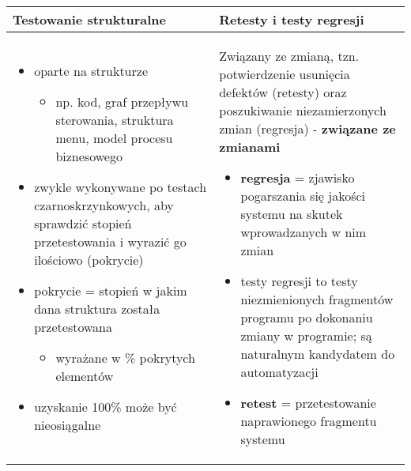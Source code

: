 \documentclass[../main.tex]{subfiles}
\begin{document}
    \begin{table}[H]
        \begin{center}
            \begin{tabular}{| p{8cm}| p{8cm}|}
                \hline
                \textbf{Testowanie strukturalne} & \textbf{Retesty i testy regresji}\\
                \hline
                \begin{itemize}
                    \item oparte na strukturze
                    \begin{itemize}
                        \item np. kod, graf przepływu sterowania, struktura menu, model procesu biznesowego
                    \end{itemize}
                    \item zwykle wykonywane po testach czarnoskrzynkowych, aby sprawdzić stopień przetestowania i wyrazić go
                    ilościowo (pokrycie)
                    \item pokrycie = stopień w jakim dana struktura została przetestowana
                    \begin{itemize}
                        \item wyrażane w \% pokrytych elementów
                    \end{itemize}
                    \item uzyskanie 100\% może być nieosiągalne
                \end{itemize}
                &
                Związany ze zmianą, tzn. potwierdzenie usunięcia defektów
                (retesty) oraz poszukiwanie niezamierzonych zmian (regresja) - \textbf{związane ze zmianami}
                \begin{itemize}
                    \item \textbf{regresja} = zjawisko pogarszania się jakości systemu na skutek
                    wprowadzanych w nim zmian
                    \item testy regresji to testy niezmienionych fragmentów programu
                    po dokonaniu zmiany w programie; są naturalnym kandydatem do automatyzacji
                    \item \textbf{retest} = przetestowanie naprawionego fragmentu systemu
                \end{itemize}\\

                \hline
            \end{tabular}
        \end{center}
    \end{table}
\end{document}
